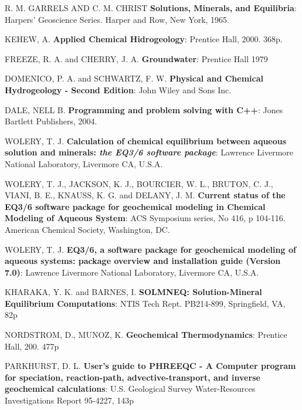 \documentclass[ppgc,mestrado,english]{iiufrgs}
\begin{document}
\renewcommand*\bibname{References}
\begin{thebibliography}{este-parametro-nao-eh-usado-pelo-estilo-ABNT}

 R. M. GARRELS AND C. M. CHRIST
 \textbf{Solutions, Minerals, and Equilibria}: Harpers' Geoscience Series. Harper and Row, New York, 1965.

 KEHEW, A.
 \textbf{Applied Chemical Hidrogeology}: Prentice Hall, 2000. 368p.

 FREEZE, R. A. and CHERRY, J. A.
\textbf{Groundwater}: Prentice Hall 1979

 DOMENICO, P. A. and SCHWARTZ, F. W.
\textbf{Physical and Chemical Hydrogeology - Second Edition}: John Wiley and Sons Inc.

  DALE, NELL B.
 \textbf{Programming and problem solving with C++}: Jones Bartlett Publishers, 2004.
   
 WOLERY, T. J. 
\textbf{Calculation of chemical equilibrium between aqueous solution and minerals: \emph{the EQ3/6 software package}}: Lawrence Livermore National Laboratory, Livermore CA, U.S.A.

 WOLERY, T. J., JACKSON, K. J., BOURCIER, W. L., BRUTON, C. J., VIANI, B. E., KNAUSS, K. G. and DELANY, J. M.
\textbf{Current status of the EQ3/6 software package for geochemical modeling in Chemical Modeling of Aqueous System}: ACS Symposium series, No 416, p 104-116. American Chemical Society, Washington, DC.

 WOLERY, T. J.
\textbf{EQ3/6, a software package for geochemical modeling of aqueous systems: package overview and installation guide (Version 7.0)}: Lawrence Livermore National Laboratory, Livermore CA, U.S.A.

 KHARAKA, Y. K. and BARNES, I.
\textbf{SOLMNEQ: Solution-Mineral Equilibrium Computations}: NTIS Tech Rept. PB214-899, Springfield, VA, 82p

 NORDSTROM, D., MUNOZ, K.
\textbf{Geochemical Thermodynamics}: Prentice Hall, 200. 477p

 PARKHURST, D. L.
\textbf{User's guide to PHREEQC - A Computer program for speciation, reaction-path, advective-transport, and inverse geochemical calculations}: U.S. Geological Survey Water-Resources Investigations Report 95-4227, 143p


\end{thebibliography}
\end{document}
